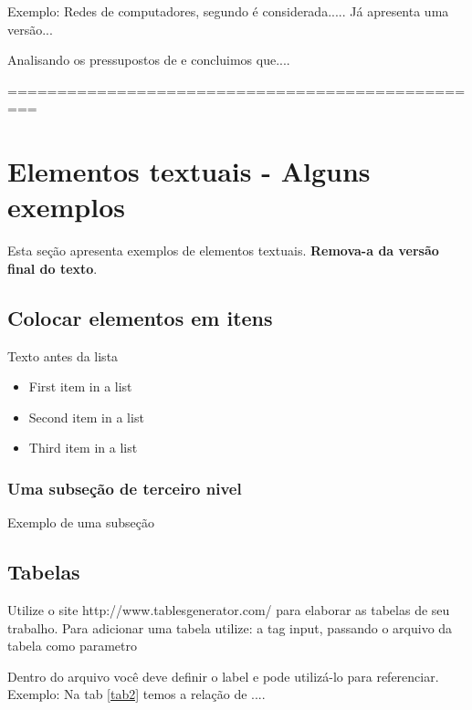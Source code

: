 \documentclass[	DIV=calc,%
							paper=a4,%
							fontsize=12pt,%
							onecolumn]{scrartcl}	 					%
\begin{document}
Exemplo: Redes de computadores, segundo \cite{t2013} é considerada..... Já \cite{kurose2010} apresenta uma versão...

Analisando os pressupostos de \cite{ref3} e \cite{ref4} concluimos que....


\renewcommand\refname{} %

  

=================================================
\section{Elementos textuais - Alguns exemplos}

Esta seção apresenta exemplos de elementos textuais. \textbf{Remova-a da versão final do texto}.


\subsection{Colocar elementos em itens}

Texto antes da lista

\begin{itemize}
	\item First item in a list 
	\item Second item in a list 
	\item Third item in a list
\end{itemize}

\subsubsection{Uma subseção de terceiro nivel}

Exemplo de uma subseção

\subsection{Tabelas}

Utilize o site http://www.tablesgenerator.com/ para elaborar as tabelas de seu trabalho.
Para adicionar uma tabela utilize: a tag input, passando o arquivo da tabela como parametro



Dentro do arquivo você deve definir o label e pode utilizá-lo para referenciar. Exemplo:
Na tab \ref{tab2} temos a relação de ....
\end{document}
